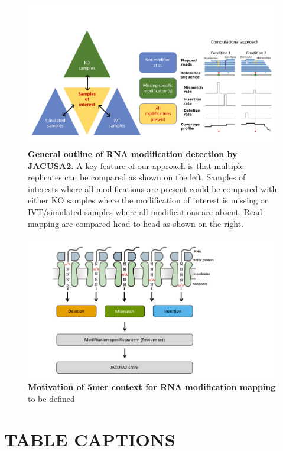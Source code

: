 \documentclass[times, 11pt, a4paper]{article}
\begin{document}
\begin{figure}[h!]
    \includegraphics[width = 1\textwidth]{Figure1.pdf}
  \caption{\textbf{General outline of RNA modification detection by JACUSA2.} A key feature of our approach is that multiple replicates can be compared as shown on the left. Samples of interests where all modifications are present could be compared with either KO samples where the modification of interest is missing or IVT/simulated samples where all modifications are absent. Read mapping are compared head-to-head as shown on the right. }
  \label{fig:graphicsummary}
      \end{figure}

\begin{figure}[h!]
    \includegraphics[width = 1\textwidth]{Figure2.pdf}
  \caption{\textbf{Motivation of 5mer context for RNA modification mapping} to be defined }
  \label{fig:5mer}
      \end{figure}

\newpage

\section*{TABLE CAPTIONS}
\end{document}
